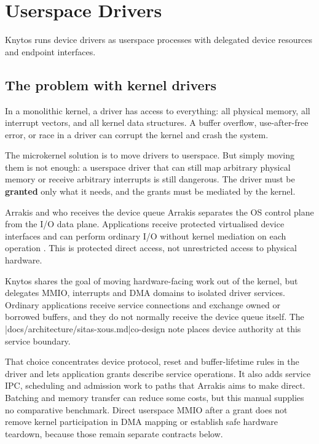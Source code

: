 \chapter{Userspace Drivers}
\label{chap:userspace-drivers}

Knytos runs device drivers as userspace processes with delegated device
resources and endpoint interfaces.

\section{The problem with kernel drivers}

In a monolithic kernel, a driver has access to everything: all physical memory,
all interrupt vectors, and all kernel data structures. A buffer overflow,
use-after-free error, or race in a driver can corrupt the kernel and crash the
system.

The microkernel solution is to move drivers to userspace. But simply moving
them is not enough: a userspace driver that can still map arbitrary physical
memory or receive arbitrary interrupts is still dangerous. The driver must be
\textbf{granted} only what it needs, and the grants must be mediated by the
kernel.

\begin{architecturalcomparison}{Arrakis and who receives the device queue}
Arrakis separates the OS control plane from the I/O data plane. Applications
receive protected virtualised device interfaces and can perform ordinary I/O
without kernel mediation on each operation \cite{prior:arrakis}. This is
protected direct access, not unrestricted access to physical hardware.

Knytos shares the goal of moving hardware-facing work out of the kernel,
but delegates MMIO, interrupts and DMA domains to isolated driver services.
Ordinary applications receive service connections and exchange owned or
borrowed buffers, and they do not normally receive the device queue itself. The
\repofiletext|docs/architecture/sitas-xous.md|{co-design note} places device
authority at this service boundary.

That choice concentrates device protocol, reset and buffer-lifetime rules in
the driver and lets application grants describe service operations. It also
adds service IPC, scheduling and admission work to paths that Arrakis aims to
make direct. Batching and memory transfer can reduce some costs, but this
manual supplies no comparative benchmark. Direct userspace MMIO after a grant
does not remove kernel participation in DMA mapping or establish safe hardware
teardown, because those remain separate contracts below.
\end{architecturalcomparison}

